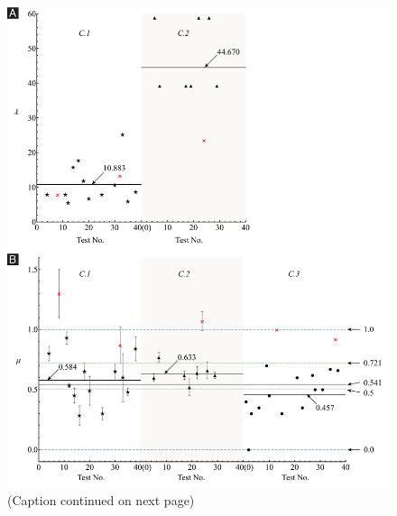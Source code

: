 \documentclass[preprint,10pt,times]{elsarticle}
\numberwithin{equation}{section}
\begin{document}
\begin{figure}
\begin{centering}
\includegraphics[width=1\textwidth]{../Figures_Submit/Distribution_V2.pdf}
\par\end{centering}
\centering{}
\label{fig:Distribution}
\caption{(Caption continued on next page)}
\end{figure}
\end{document}
